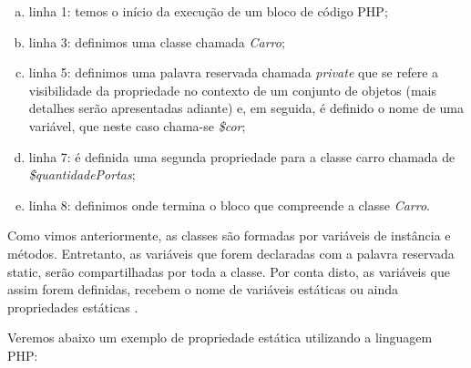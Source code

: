 \begin{enumerate}[a)]
    \item linha 1: temos o início da execução de um bloco de código PHP;
    \item linha 3: definimos uma classe chamada \textit{Carro};
    \item linha 5: definimos uma palavra reservada chamada
    \textit{private} que se refere a visibilidade da propriedade no contexto  de
    um conjunto de objetos (mais detalhes serão apresentadas adiante) e, em
    seguida, é definido o nome de uma variável, que neste caso chama-se \textit{\$cor};
    \item linha 7: é definida uma segunda propriedade para a classe
    carro chamada de \textit{\$quantidadePortas};
    \item linha 8: definimos onde termina o bloco que compreende a
    classe \textit{Carro}.
\end{enumerate}


Como vimos anteriormente, as classes são formadas por variáveis de instância e
métodos. Entretanto, as variáveis que forem declaradas com a palavra reservada
static, serão compartilhadas por toda a classe. Por conta disto, as variáveis
que assim forem definidas, recebem o nome de variáveis estáticas ou ainda
propriedades estáticas \cite{learningJava}.

Veremos abaixo um exemplo de propriedade estática utilizando a linguagem PHP:

